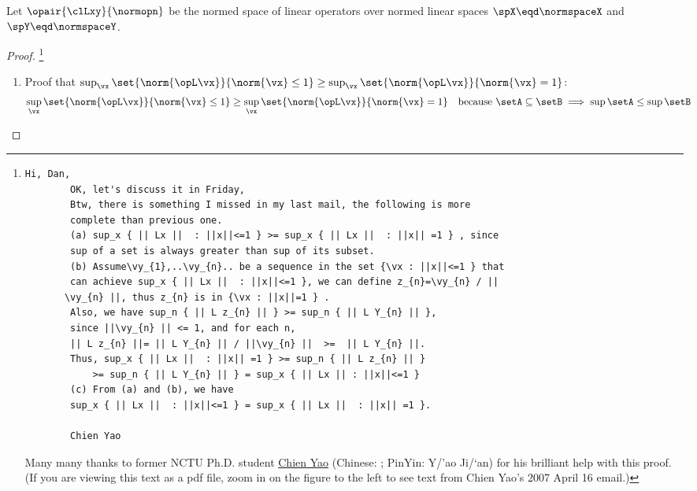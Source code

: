 \begin{lemma}
\label{lem:opnorm}
Let $\opair{\clLxy}{\normopn}$ be the normed space of linear operators over normed linear spaces
$\spX\eqd\normspaceX$ and $\spY\eqd\normspaceY$.
\end{lemma}
\begin{proof}
  \footnote{\begin{minipage}[t]{2\tw/16+1ex}%
      \fontsize{0.5mm}{0.5mm}%
      \begin{Verbatim}[frame=single, gobble=8, label={\footnotesize\rmfamily email}]
        Hi, Dan,
        OK, let's discuss it in Friday,
        Btw, there is something I missed in my last mail, the following is more
        complete than previous one.
        (a) sup_x { || Lx ||  : ||x||<=1 } >= sup_x { || Lx ||  : ||x|| =1 } , since
        sup of a set is always greater than sup of its subset.
        (b) Assume\vy_{1},..\vy_{n}.. be a sequence in the set {\vx : ||x||<=1 } that
        can achieve sup_x { || Lx ||  : ||x||<=1 }, we can define z_{n}=\vy_{n} / ||
       \vy_{n} ||, thus z_{n} is in {\vx : ||x||=1 } .
        Also, we have sup_n { || L z_{n} || } >= sup_n { || L Y_{n} || },
        since ||\vy_{n} || <= 1, and for each n,
        || L z_{n} ||= || L Y_{n} || / ||\vy_{n} ||  >=  || L Y_{n} ||.
        Thus, sup_x { || Lx ||  : ||x|| =1 } >= sup_n { || L z_{n} || }
            >= sup_n { || L Y_{n} || } = sup_x { || Lx || : ||x||<=1 }
        (c) From (a) and (b), we have
        sup_x { || Lx ||  : ||x||<=1 } = sup_x { || Lx ||  : ||x|| =1 }.

        Chien Yao
      \end{Verbatim}
    \end{minipage}
    \hfill
    \begin{minipage}[t]{13\tw/16-3ex}
      Many many thanks to former NCTU Ph.D. student
      \href{http://web.ntpu.edu.tw/~yshan/it07.pdf}{Chien Yao} (Chinese: \zht{\zhtYao\zhtJian}; PinYin: Y{/'a}o Ji/`an) 
      for his brilliant help with this proof.
      (If you are viewing this text as a pdf file,
       zoom in on the figure to the left to see text from Chien Yao's 2007 April 16 email.)
    \end{minipage}
  }


\begin{enumerate}
  \item Proof that $\sup_{\vx} \set{\norm{\opL\vx}}{\norm{\vx}\le1}
       \ge \sup_{\vx} \set{\norm{\opL\vx}}{\norm{\vx}=1}$:
    \begin{align*}
      \sup_{\vx} \set{\norm{\opL\vx}}{\norm{\vx}\le1}
        &\ge \sup_{\vx} \set{\norm{\opL\vx}}{\norm{\vx}=1}
        &&   \text{because $\setA\subseteq\setB \implies \sup\setA \le \sup\setB$}
    \end{align*}


\end{enumerate}
\end{proof}
